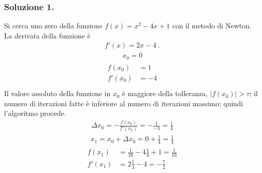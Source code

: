\documentclass[letterpaper,10pt,italian]{jupyterBook}
\begin{document}
\subsubsection*{Soluzione 1.}

\sphinxAtStartPar
Si cerca uno zero della funzione \(f(x) = x^2 - 4x + 1\) con il metodo di Newton. La derivata della funzione è
\begin{equation*}
\begin{split}f'(x) = 2 x - 4 \ .\end{split}
\end{equation*}
\sphinxAtStartPar
{}
\begin{equation*}
\begin{split}x_0 = 0\end{split}
\end{equation*}
\sphinxAtStartPar
{}
\begin{equation*}
\begin{split}\begin{aligned}
   f(x_0)  & =  1 \\
  f'(x_0)  & = -4 \\
\end{aligned}\end{split}
\end{equation*}
\sphinxAtStartPar
Il valore assoluto della funzione in \(x_0\) è maggiore della tolleranza, \(|f(x_0)| > \tau\); il numero di iterazioni fatte è inferiore al numero di iterazioni massimo; quindi l’algoritmo procede.
\begin{equation*}
\begin{split}\Delta x_0 = - \frac{f(x_0)}{f'(x_0)} = -\frac{1}{-4} = \frac{1}{4}\end{split}
\end{equation*}\begin{equation*}
\begin{split}x_1 = x_0 + \Delta x_0 = 0 + \frac{1}{4} = \frac{1}{4}\end{split}
\end{equation*}
\sphinxAtStartPar
{}
\begin{equation*}
\begin{split}\begin{aligned}
   f(x_1)  & = \frac{1}{16} - 4 \frac{1}{4} + 1 = \frac{1}{16} \\
  f'(x_1)  & = 2 \frac{1}{4} - 4 = - \frac{7}{2}  \\
\end{aligned}\end{split}
\end{equation*}
\end{document}
